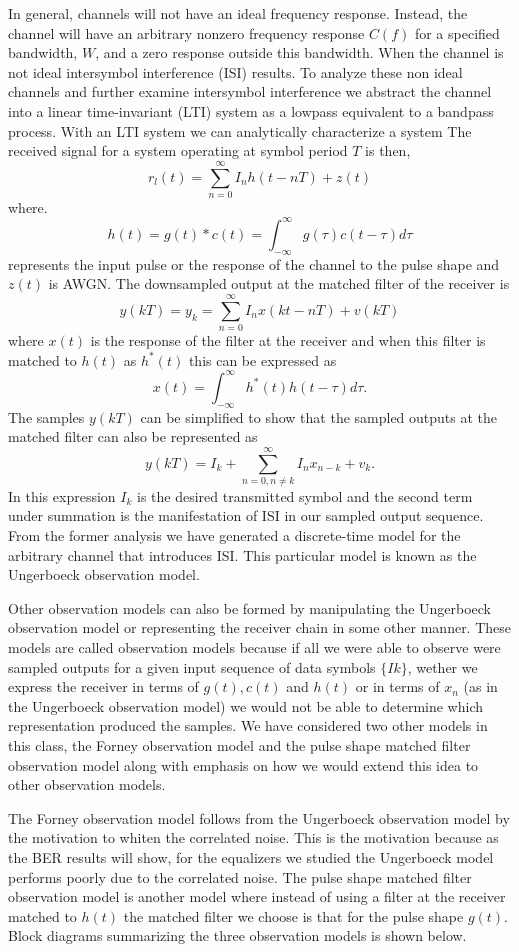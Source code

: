 In general, channels will not have an ideal frequency response. Instead, the channel will have an arbitrary nonzero frequency response $C(f)$ for a specified bandwidth, $W$, and a zero response outside this bandwidth. When the channel is not ideal intersymbol interference (ISI) results. To analyze these non ideal channels and further examine intersymbol interference we abstract the channel into a linear time-invariant (LTI) system as a lowpass equivalent to a bandpass process. With an LTI system we can analytically characterize a system
The received signal for a system operating at symbol period $T$ is then,
\[ r_l(t) = \sum_{n=0}^{\infty} I_n h(t -nT) + z(t) \]
where.
\[h(t) =  g(t) * c(t) = \int_{-\infty}^{\infty} g(\tau)c(t-\tau)d\tau \]
represents the input pulse or the response of the channel to the pulse shape and $z(t)$ is AWGN. The downsampled output at the matched filter of the receiver is
\[ y(kT) = y_k = \sum_{n=0}^{\infty} I_n x(kt-nT) + v(kT)\]
where $x(t)$ is the response of the filter at the receiver and when this filter is matched to $h(t)$ as $h^*(t)$ this can be expressed as
\[x(t) = \int_{-\infty}^{\infty} h^*(t)h(t-\tau) d\tau. \]
The samples $y(kT)$ can be simplified to show that the sampled outputs at the matched filter can also be represented as
\[ y(kT) = I_k + \sum_{n=0, n \neq k}^{\infty} I_n x_{n-k} + v_{k}. \]
In this expression $I_k$ is the desired transmitted symbol and the second term under summation is the manifestation of ISI in our sampled output sequence.
From the former analysis we have generated a discrete-time model for the arbitrary channel that introduces ISI. This particular model is known as the Ungerboeck observation model.

Other observation models can also be formed by manipulating the Ungerboeck observation model or representing the receiver chain in some other manner. These models are called observation models because if all we were able to observe were sampled outputs for a given input sequence of data symbols $\{Ik\}$, wether we express the receiver in terms of $g(t), c(t)$ and $h(t)$ or in terms of $x_n$ (as in the Ungerboeck observation model) we would not be able to determine which representation produced the samples. We have considered two other models in this class, the Forney observation model and the pulse shape matched filter observation model along with emphasis on how we would extend this idea to other observation models.

The Forney observation model follows from the Ungerboeck observation model by the motivation to whiten the correlated noise. This is the motivation because as the BER results will show, for the equalizers we studied the Ungerboeck model performs poorly due to the correlated noise. The pulse shape matched filter observation model is another model where instead of using a filter at the receiver matched to $h(t)$ the matched filter we choose is that for the pulse shape $g(t)$. Block diagrams summarizing the three observation models is shown below.





